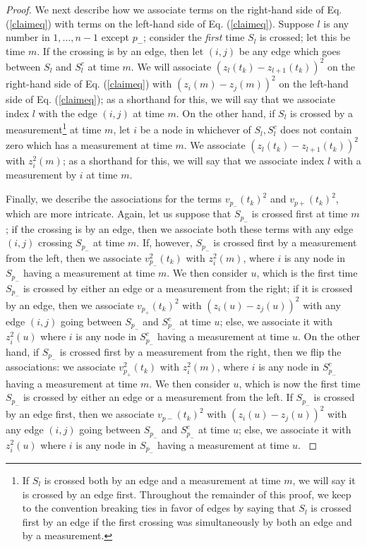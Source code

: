 \documentclass[final]{siamltex}
\begin{document}
\begin{proof}
{{{We next describe how we associate terms on the right-hand side of Eq. (\ref{claimeq}) with terms on the left-hand side of Eq. (\ref{claimeq}). 
Suppose $l$ is any number in $1, \ldots, n-1$ except $p_{-}$;  consider the {\em first} time $S_l$ is crossed; let this be time $m$. If the crossing is  by an edge,  then let $(i,j)$ be any edge which goes between $S_l$ and $S_l^c$ at time $m$. We will associate $(z_l(t_k)-z_{l+1}(t_k))^2$ {{{on the right-hand side of Eq. (\ref{claimeq})}}} with $(z_i(m)-z_j(m))^2$ {{{on the left-hand side of Eq. (\ref{claimeq})}}}; as a shorthand for this, we will say that we associate index $l$ with the edge $(i,j)$ at time $m$. On the other hand, if $S_l$ is crossed by a measurement\footnote{If $S_l$ is crossed both by an edge and a measurement at time $m$, we will say it is crossed by an edge first. Throughout the remainder of this proof, we keep to the convention breaking ties in favor of edges by saying that $S_l$ is crossed first by an edge if the first crossing was simultaneously by both an edge and by a measurement.} at time $m$, let $i$ be a node in whichever of $S_l, S_l^c$ does not contain zero which has a measurement at time $m$. We associate $(z_l(t_k) - z_{l+1}(t_k))^2$ with $z_i^2(m)$; as a shorthand for this, we will say that we associate index $l$ with a measurement by $i$ at time $m$. }}}

{{{Finally, we describe the associations for  the terms $v_{p_-}(t_k)^2$ and $v_{p+}(t_k)^2$, which are more intricate. Again, let us suppose that $S_{p_-}$ is crossed first at time $m$; if the crossing is by an edge, then we associate both these terms with any edge $(i,j)$ crossing $S_{p_-}$ at time $m$. If, however, $S_{p_-}$ is crossed first by a measurement from the left, then we associate $v_{p_-}^2(t_k)$ with $z_i^2(m)$, where $i$ is any node in $S_{p_-}$ having a measurement at time $m$. We then consider $u$, which is the first time $S_{p_-}$ is crossed by either an edge or a measurement from the right; if it is crossed by an edge, then  we associate $v_{p_+}(t_k)^2$ with $(z_i(u)-z_j(u))^2$ with any edge $(i,j)$ going between $S_{p_-}$ and $S_{p_-}^c$ at time $u$; else, we associate it with $z_i^2(u)$ where $i$ is any node in $S_{p_-}^c$ having a measurement at time $u$.  On the other hand, if $S_{p_-}$ is crossed first by a measurement from the right, then we flip the associations:
we associate $v_{p_+}^2(t_k)$ with $z_i^2(m)$, where $i$ is any node in $S_{p_-}^c$ having a measurement at time $m$. We then consider $u$, which is now the first time $S_{p_-}$ is crossed by either an edge or a measurement from the left.  If $S_{p_-}$ is crossed by an edge first, then we associate $v_{p-}(t_k)^2$ with $(z_i(u)-z_j(u))^2$ with any edge $(i,j)$ going between $S_{p_-}$ and $S_{p_-}^c$ at time $u$; else, we associate it with $z_i^2(u)$ where $i$ is any node in $S_{p_-}$ having a measurement at time $u$. }}}


\end{proof}
\end{document}
